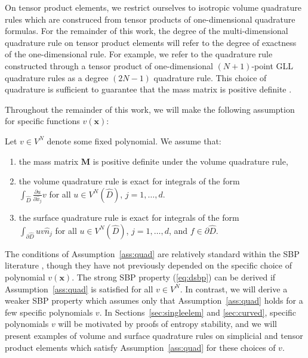 \documentclass{svjour3}                     %
\renewcommand{\hat}{\widehat}
\newcommand{\pd}[2]{\frac{\partial#1}{\partial#2}}
\newcommand{\LRp}[1]{\left( #1 \right)}
\begin{document}
On tensor product elements, we restrict ourselves to isotropic volume quadrature rules which are construced from tensor products of one-dimensional quadrature formulas.  For the remainder of this work, the degree of the multi-dimensional quadrature rule on tensor product elements will refer to the degree of exactness of the one-dimensional rule.  For example, we refer to the quadrature rule constructed through a tensor product of one-dimensional $(N+1)$-point GLL quadrature rules as a degree $(2N-1)$ quadrature rule.  This choice of quadrature is sufficient to guarantee that the mass matrix is positive definite \cite{canuto2007spectral}.  

Throughout the remainder of this work, we will make the following assumption for specific functions $v(\bm{x})$:
\begin{assumption}
\label{ass:quad}
Let $v \in V^{N}$ denote some fixed polynomial.  We assume that: 
\begin{enumerate}
\item the mass matrix $\bm{M}$ is positive definite under the volume quadrature rule,
\item the volume quadrature rule is exact for integrals of the form\\$\int_{\hat{D}} \pd{u}{\hat{x}_j} v$ for all $u \in V^N\LRp{\hat{D}}$, $j = 1,\ldots, d$.
\item the surface quadrature rule is exact for integrals of the form\\$\int_{\partial \hat{D}} u v \hat{n}_j$ for all $u \in V^N\LRp{\hat{D}}$, $j = 1,\ldots, d$, and $f \in \partial \hat{D}$.  
\end{enumerate}
\end{assumption}

The conditions of Assumption~\ref{ass:quad} are relatively standard within the SBP literature \cite{hicken2016multidimensional, chan2017discretely, crean2018entropy}, though they have not previously depended on the specific choice of polynomial $v(\bm{x})$.   The strong SBP property (\ref{eq:dsbp}) can be derived if Assumption~\ref{ass:quad} is satisfied for all $v \in V^N$.  In contrast, we will derive a weaker SBP property which assumes only that Assumption~\ref{ass:quad} holds for a few specific polynomials $v$.  In Sections~\ref{sec:singleelem} and \ref{sec:curved}, specific polynomials $v$ will be motivated by proofs of entropy stability, and we will present examples of volume and surface quadrature rules on simplicial and tensor product elements which satisfy Assumption~\ref{ass:quad} for these choices of $v$.  
\end{document}

